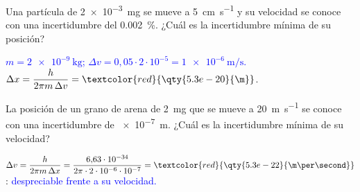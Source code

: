 \begin{exercise}
    Una partícula de \qty{2e-3}{\mg} se mueve a \qty{5}{\cm\per\second} y su velocidad se conoce con una incertidumbre del \qty{0.002}{\percent}.
    ¿Cuál es la incertidumbre mínima de su posición?
    \begin{solu}
        \textcolor{blue}{\(m = \qty{2e-9}{\kg}\); \(\Delta v = 0{,}05\cdot 2\cdot 10^{-5} = \qty{1e-6}{\m\per\second}\).}
        \(\Delta x = \dfrac{h}{2\pi m\,\Delta v} = \textcolor{red}{\qty{5.3e-20}{\m}}\).
    \end{solu}
\end{exercise}

\begin{exercise}
    La posición de un grano de arena de \qty{2}{\mg} que se mueve a \qty{20}{\m\per\second} se conoce con una incertidumbre de \qty{e-7}{\m}.
    ¿Cuál es la incertidumbre mínima de su velocidad?
    \begin{solu}
        \(\Delta v = \dfrac{h}{2\pi m\,\Delta x} = \dfrac{6{,}63\cdot 10^{-34}}{2\pi\cdot 2\cdot 10^{-6}\cdot 10^{-7}} = \textcolor{red}{\qty{5.3e-22}{\m\per\second}}\):
        \textcolor{blue}{despreciable frente a su velocidad.}
    \end{solu}
\end{exercise}
